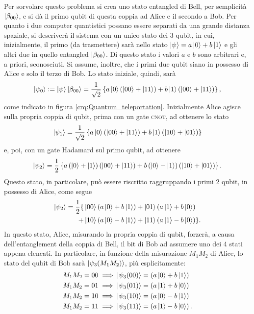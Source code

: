 Per sorvolare questo problema si crea uno stato entangled di Bell, per semplicità $\ket{\beta_{00}}$, e si dà il primo qubit di questa coppia ad Alice e il secondo a Bob.
Per quanto i due computer quantistici possano essere separati da una grande distanza spaziale, si descriverà il sistema con un unico stato dei 3-qubit, in cui, inizialmente, il primo (da trasmettere) sarà nello stato $\ket{\psi} = a \ket{0} + b \ket{1}$ e gli altri due in quello entangled $\ket{\beta_{00}}$.
Di questo stato i valori $a$ e $b$ sono arbitrari e, a priori, sconosciuti.
Si assume, inoltre, che i primi due qubit siano in possesso di Alice e solo il terzo di Bob.
Lo stato iniziale, quindi, sarà
\begin{equation}
 \ket{\psi_0} := \ket{\psi}\ket{\beta_{00}} = \frac{1}{\sqrt{2}}\left\{ a\ket{0} \left(\ket{00} + \ket{11} \right) + b\ket{1} \left(\ket{00} + \ket{11} \right) \right\},
\end{equation}
come indicato in figura \ref{crq:Quantum_teleportation}. Inizialmente Alice agisce sulla propria coppia di qubit, prima con un gate \textsc{cnot}, ad ottenere lo stato
\begin{equation}
 \ket{\psi_1} = \frac{1}{\sqrt{2}}\left\{a \ket{0} \left(\ket{00} + \ket{11} \right) + b \ket{1} \left(\ket{10} + \ket{01} \right) \right\}
\end{equation}
e, poi, con un gate Hadamard sul primo qubit, ad ottenere
\begin{equation}
 \ket{\psi_2} = \frac{1}{2} \left\{a \left(\ket{0} + \ket{1} \right) \left(\ket{00} + \ket{11} \right) + b \left(\ket{0} - \ket{1} \right) \left(\ket{10} + \ket{01} \right) \right\}.
\end{equation}
Questo stato, in particolare, può essere riscritto raggruppando i primi 2 qubit, in possesso di Alice, come segue
\begin{align}
 \ket{\psi_2} = \frac{1}{2}\{&\ket{00} \left(a\ket{0} + b\ket{1} \right) + \ket{01} \left(a\ket{1} + b\ket{0} \right) \nonumber \\
 + &\ket{10} \left(a\ket{0} - b\ket{1} \right) + \ket{11} \left(a\ket{1} - b\ket{0} \right) \}.
\end{align}
In questo stato, Alice, misurando la propria coppia di qubit, forzerà, a causa dell'entanglement della coppia di Bell, il bit di Bob ad assumere uno dei $4$ stati appena elencati. 
In particolare, in funzione della misurazione $M_1M_2$ di Alice, lo stato del qubit di Bob sarà $\ket{\psi_3(M_1M_2)}$, più esplicitamente:
\begin{align}\label{eqn:QT_post_measure1}
 M_1M_2 = 00 \implies \ket{\psi_3(00)} &= \left( a \ket{0} + b \ket{1} \right)\\
 M_1M_2 = 01 \implies \ket{\psi_3(01)} &= \left( a \ket{1} + b \ket{0} \right)\\
 M_1M_2 = 10 \implies \ket{\psi_3(10)} &= \left( a \ket{0} - b \ket{1} \right)\\
 M_1M_2 = 11 \implies \ket{\psi_3(11)} &= \left( a \ket{1} - b \ket{0} \right).\label{eqn:QT_post_measure4}
\end{align}
